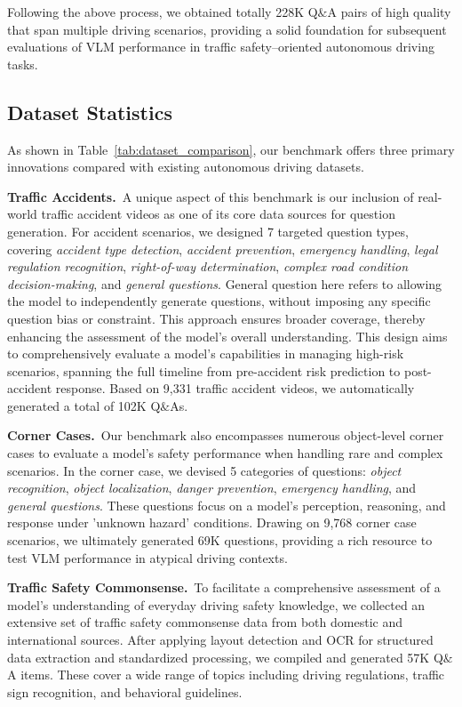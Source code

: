 \documentclass[sigconf]{acmart}
\begin{document}
Following the above process, we obtained totally 228K Q$\&$A pairs of high quality that span multiple driving scenarios, providing a solid foundation for subsequent evaluations of VLM performance in traffic safety–oriented autonomous driving tasks.

\subsection{Dataset Statistics}

As shown in Table~\ref{tab:dataset_comparison}, our benchmark offers three primary innovations compared with existing autonomous driving datasets.

\noindent\textbf{Traffic Accidents.}~A unique aspect of this benchmark is our inclusion of real-world traffic accident videos as one of its core data sources for question generation. For accident scenarios, we designed 7 targeted question types, covering \emph{accident type detection}, \emph{accident prevention}, \emph{emergency handling}, \emph{legal regulation recognition}, \emph{right-of-way determination}, \emph{complex road condition decision-making}, and \emph{general questions}. General question here refers to allowing the model to independently generate questions, without imposing any specific question bias or constraint. This approach ensures broader coverage, thereby enhancing the assessment of the model’s overall understanding. This design aims to comprehensively evaluate a model’s capabilities in managing high-risk scenarios, spanning the full timeline from pre-accident risk prediction to post-accident response. Based on 9,331 traffic accident videos, we automatically generated a total of 102K Q$\&$As. 

\noindent\textbf{Corner Cases.}~Our benchmark also encompasses numerous object-level corner cases to evaluate a model’s safety performance when handling rare and complex scenarios. In the corner case, we devised 5 categories of questions: \emph{object recognition}, \emph{object localization}, \emph{danger prevention}, \emph{emergency handling}, and \emph{general questions}. These questions focus on a model’s perception, reasoning, and response under 'unknown hazard' conditions. Drawing on 9,768 corner case scenarios, we ultimately generated 69K questions, providing a rich resource to test VLM performance in atypical driving contexts. 

\noindent\textbf{Traffic Safety Commonsense.}~To facilitate a comprehensive assessment of a model’s understanding of everyday driving safety knowledge, we collected an extensive set of traffic safety commonsense data from both domestic and international sources. After applying layout detection and OCR for structured data extraction and standardized processing, we compiled and generated 57K Q$\&$A items. These cover a wide range of topics including driving regulations, traffic sign recognition, and behavioral guidelines.
\end{document}
